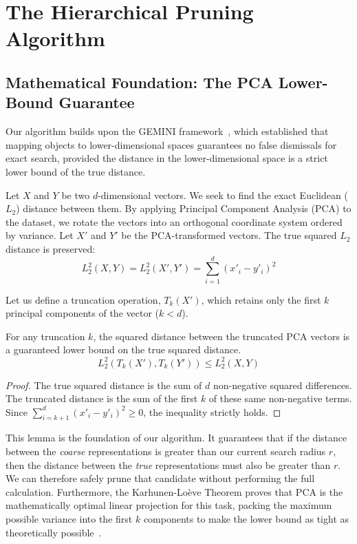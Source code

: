 \documentclass[sigconf]{acmart}
\begin{document}
\section{The Hierarchical Pruning Algorithm}

\subsection{Mathematical Foundation: The PCA Lower-Bound Guarantee}

Our algorithm builds upon the GEMINI framework~\cite{faloutsos1994fast}, which established that mapping objects to lower-dimensional spaces guarantees no false dismissals for exact search, provided the distance in the lower-dimensional space is a strict lower bound of the true distance.

Let $X$ and $Y$ be two $d$-dimensional vectors. We seek to find the exact Euclidean ($L_2$) distance between them. By applying Principal Component Analysis (PCA) to the dataset, we rotate the vectors into an orthogonal coordinate system ordered by variance. Let $X'$ and $Y'$ be the PCA-transformed vectors. The true squared $L_2$ distance is preserved:
\begin{equation}
    L_2^2(X, Y) = L_2^2(X', Y') = \sum_{i=1}^{d} (x'_i - y'_i)^2
\end{equation}

Let us define a truncation operation, $T_k(X')$, which retains only the first $k$ principal components of the vector ($k < d$).

\begin{lemma}
For any truncation $k$, the squared distance between the truncated PCA vectors is a guaranteed lower bound on the true squared distance.
\begin{equation}
    L_2^2(T_k(X'), T_k(Y')) \leq L_2^2(X, Y)
\end{equation}
\end{lemma}

\begin{proof}
The true squared distance is the sum of $d$ non-negative squared differences. The truncated distance is the sum of the first $k$ of these same non-negative terms. Since $\sum_{i=k+1}^{d} (x'_i - y'_i)^2 \geq 0$, the inequality strictly holds.
\end{proof}

This lemma is the foundation of our algorithm. It guarantees that if the distance between the \textit{coarse} representations is greater than our current search radius $r$, then the distance between the \textit{true} representations must also be greater than $r$. We can therefore safely prune that candidate without performing the full calculation. Furthermore, the Karhunen-Loève Theorem proves that PCA is the mathematically optimal linear projection for this task, packing the maximum possible variance into the first $k$ components to make the lower bound as tight as theoretically possible~\cite{weber1998quantitative}.
\end{document}
